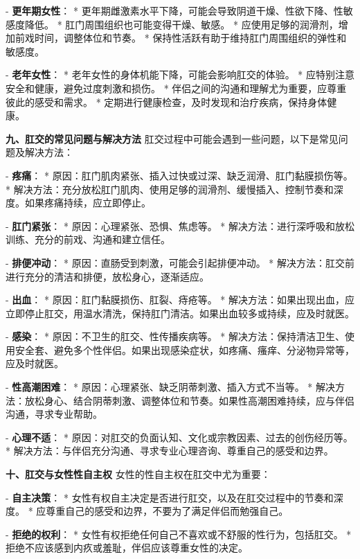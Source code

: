 \begin{enumerate}
  - \textbf{更年期女性}：
    * 更年期雌激素水平下降，可能会导致阴道干燥、性欲下降、性敏感度降低。
    * 肛门周围组织也可能变得干燥、敏感。
    * 应使用足够的润滑剂，增加前戏时间，调整体位和节奏。
    * 保持性活跃有助于维持肛门周围组织的弹性和敏感度。

  - \textbf{老年女性}：
    * 老年女性的身体机能下降，可能会影响肛交的体验。
    * 应特别注意安全和健康，避免过度刺激和损伤。
    * 伴侣之间的沟通和理解尤为重要，应尊重彼此的感受和需求。
    * 定期进行健康检查，及时发现和治疗疾病，保持身体健康。

  \textbf{九、肛交的常见问题与解决方法}
  肛交过程中可能会遇到一些问题，以下是常见问题及解决方法：

  - \textbf{疼痛}：
    * 原因：肛门肌肉紧张、插入过快或过深、缺乏润滑、肛门黏膜损伤等。
    * 解决方法：充分放松肛门肌肉、使用足够的润滑剂、缓慢插入、控制节奏和深度。如果疼痛持续，应立即停止。

  - \textbf{肛门紧张}：
    * 原因：心理紧张、恐惧、焦虑等。
    * 解决方法：进行深呼吸和放松训练、充分的前戏、沟通和建立信任。

  - \textbf{排便冲动}：
    * 原因：直肠受到刺激，可能会引起排便冲动。
    * 解决方法：肛交前进行充分的清洁和排便，放松身心，逐渐适应。

  - \textbf{出血}：
    * 原因：肛门黏膜损伤、肛裂、痔疮等。
    * 解决方法：如果出现出血，应立即停止肛交，用温水清洗，保持肛门清洁。如果出血较多或持续，应及时就医。

  - \textbf{感染}：
    * 原因：不卫生的肛交、性传播疾病等。
    * 解决方法：保持清洁卫生、使用安全套、避免多个性伴侣。如果出现感染症状，如疼痛、瘙痒、分泌物异常等，应及时就医。

  - \textbf{性高潮困难}：
    * 原因：心理紧张、缺乏阴蒂刺激、插入方式不当等。
    * 解决方法：放松身心、结合阴蒂刺激、调整体位和节奏。如果性高潮困难持续，应与伴侣沟通，寻求专业帮助。

  - \textbf{心理不适}：
    * 原因：对肛交的负面认知、文化或宗教因素、过去的创伤经历等。
    * 解决方法：与伴侣充分沟通、寻求专业心理咨询、尊重自己的感受和边界。

  \textbf{十、肛交与女性性自主权}
  女性的性自主权在肛交中尤为重要：

  - \textbf{自主决策}：
    * 女性有权自主决定是否进行肛交，以及在肛交过程中的节奏和深度。
    * 应尊重自己的感受和边界，不要为了满足伴侣而勉强自己。

  - \textbf{拒绝的权利}：
    * 女性有权拒绝任何自己不喜欢或不舒服的性行为，包括肛交。
    * 拒绝不应该感到内疚或羞耻，伴侣应该尊重女性的决定。


\end{enumerate}
